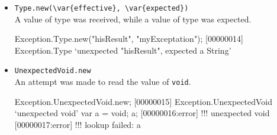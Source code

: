 \begin{itemize}
\begin{urbiscript}
try
{
  eval("1 / / 0");
}
catch (var e)
{
  assert
  {
    e.isA(Exception.Syntax);
    e.loc.asString == "1.5";
    e.input == "1 / / 0";
    e.message == "unexpected /";
  }
};
\end{urbiscript}


\item \lstinline|Type.new(\var{effective}, \var{expected})|\\
  A value of type  was received, while a value of type
   was expected.
\begin{urbiscript}
Exception.Type.new("hisResult", "myExceptation");
[00000014] Exception.Type `unexpected "hisResult", expected a String'
\end{urbiscript}

\item \lstinline|UnexpectedVoid.new|\\
  An attempt was made to read the value of \lstinline|void|.
\begin{urbiscript}
Exception.UnexpectedVoid.new;
[00000015] Exception.UnexpectedVoid `unexpected void'
var a = void;
a;
[00000016:error] !!! unexpected void
[00000017:error] !!! lookup failed: a
\end{urbiscript}

\end{itemize}


